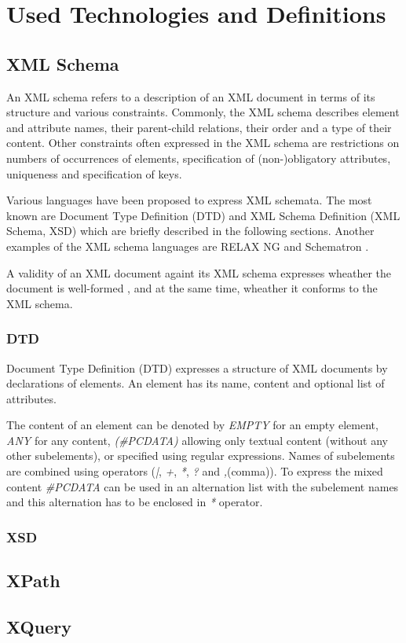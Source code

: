 \chapter{Used Technologies and Definitions}


\section{XML Schema}
An XML schema refers to a description of an XML document in terms of its structure and various constraints. Commonly, the XML schema describes element and attribute names, their parent-child relations, their order and a type of their content. Other constraints often expressed in the XML schema are restrictions on numbers of occurrences of elements, specification of (non-)obligatory attributes, uniqueness and specification of keys.

Various languages have been proposed to express XML schemata. The most known are Document Type Definition (DTD) \cite{Bray:08:EML} and XML Schema Definition (XML Schema, XSD) \cite{Walmsley:04:XSP, Thompson:04:XSP, Malhotra:04:XSP} which are briefly described in the following sections. Another examples of the XML schema languages are RELAX NG \cite{relaxng} and  Schematron \cite{schematron}.

A validity of an XML document againt its XML schema expresses wheather the document is well-formed \cite{Bray:08:EML}, and at the same time, wheather it conforms to the XML schema.

\subsection{DTD}
Document Type Definition (DTD) expresses a structure of XML documents by declarations of elements. An element has its name, content and optional list of attributes.

The content of an element can be denoted by \emph{EMPTY} for an empty element, \emph{ANY} for any content, \emph{(\#PCDATA)} allowing only textual content (without any other subelements), or specified using regular expressions. Names of subelements are combined using operators (\emph{|}, \emph{+}, \emph{*}, \emph{?} and \emph{,}(comma)). To express the mixed content \emph{\#PCDATA} can be used in an alternation list with the subelement names and this alternation has to be enclosed in \emph{*} operator.


\subsection{XSD}

\section{XPath}

\section{XQuery}

